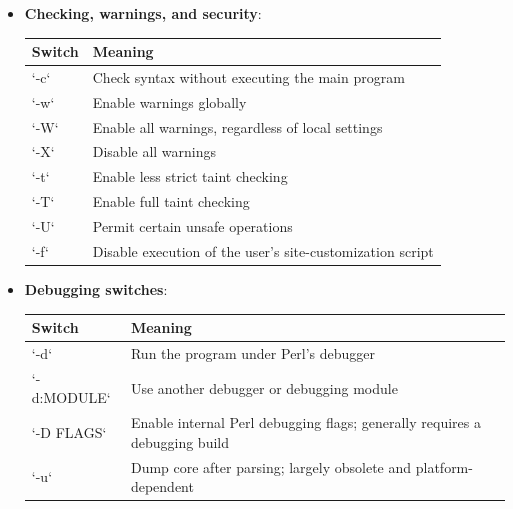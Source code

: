 \documentclass{report}
\begin{document}
\begin{itemize}
        \item \textbf{Checking, warnings, and security}: 
            \begin{center}
                \begin{tabularx}{\textwidth}{@{}lX@{}}
                    \toprule
                    \textbf{Switch} & \textbf{Meaning} \\
                    \midrule
                    `-c` & Check syntax without executing the main program \\[2ex]
                    `-w` & Enable warnings globally \\[2ex]
                    `-W` & Enable all warnings, regardless of local settings \\[2ex]
                    `-X` & Disable all warnings \\[2ex]
                    `-t` & Enable less strict taint checking \\[2ex]
                    `-T` & Enable full taint checking \\[2ex]
                    `-U` & Permit certain unsafe operations \\[2ex]
                    `-f` & Disable execution of the user’s site-customization script \\
                    \bottomrule
                \end{tabularx}
            \end{center}
        \item \textbf{Debugging switches}: 
            \begin{center}
                \begin{tabularx}{\textwidth}{@{}lXl@{}}
                    \toprule
                    \textbf{Switch} & \textbf{Meaning} \\
                    \midrule
                    `-d` & Run the program under Perl’s debugger \\[2ex]
                    `-d:MODULE` & Use another debugger or debugging module \\[2ex]
                    `-D FLAGS` & Enable internal Perl debugging flags; generally requires a debugging build \\[2ex]
                    `-u` & Dump core after parsing; largely obsolete and platform-dependent \\
                    \bottomrule
                \end{tabularx}
            \end{center}


    \end{itemize}
\end{document}
